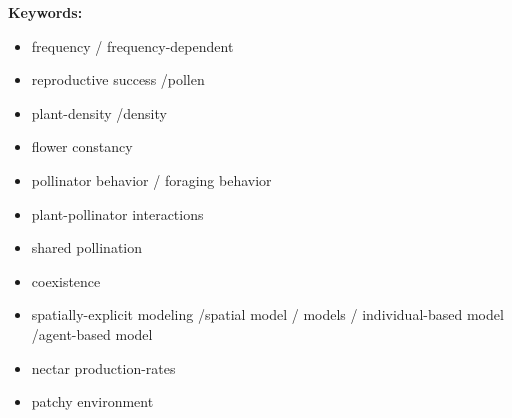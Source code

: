 \documentclass{article}
\begin{document}
\textbf{Keywords:}
\begin{itemize}
\item  frequency / frequency-dependent 
\item reproductive success /pollen
\item plant-density /density
\item flower constancy
\item pollinator behavior / foraging behavior
\item plant-pollinator interactions
\item shared pollination
\item coexistence
\item spatially-explicit modeling /spatial model / models / individual-based model /agent-based model
\item nectar production-rates
\item patchy environment

\end{itemize}


\newpage
%
\newpage


\newpage


\newpage


\newpage


\newpage


\newpage





\newpage




\newpage

%
%
\newpage



\newpage



%
\end{document}

